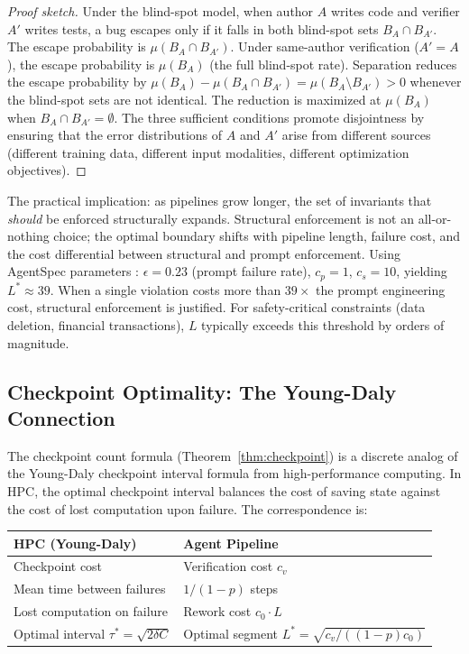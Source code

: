 \begin{proof}[Proof sketch]
Under the blind-spot model, when author $A$ writes code and verifier $A'$ writes tests, a bug escapes only if it falls in both blind-spot sets $B_A \cap B_{A'}$. The escape probability is $\mu(B_A \cap B_{A'})$. Under same-author verification ($A' = A$), the escape probability is $\mu(B_A)$ (the full blind-spot rate). Separation reduces the escape probability by $\mu(B_A) - \mu(B_A \cap B_{A'}) = \mu(B_A \setminus B_{A'}) > 0$ whenever the blind-spot sets are not identical. The reduction is maximized at $\mu(B_A)$ when $B_A \cap B_{A'} = \emptyset$. The three sufficient conditions promote disjointness by ensuring that the error distributions of $A$ and $A'$ arise from different sources (different training data, different input modalities, different optimization objectives).
\end{proof}

The practical implication: as pipelines grow longer, the set of invariants that \emph{should} be enforced structurally expands. Structural enforcement is not an all-or-nothing choice; the optimal boundary shifts with pipeline length, failure cost, and the cost differential between structural and prompt enforcement. Using AgentSpec parameters \citep{wang2026agentspec}: $\epsilon = 0.23$ (prompt failure rate), $c_p = 1$, $c_s = 10$, yielding $L^* \approx 39$. When a single violation costs more than $39\times$ the prompt engineering cost, structural enforcement is justified. For safety-critical constraints (data deletion, financial transactions), $L$ typically exceeds this threshold by orders of magnitude.

\subsection{Checkpoint Optimality: The Young-Daly Connection}

The checkpoint count formula (Theorem~\ref{thm:checkpoint}) is a discrete analog of the Young-Daly checkpoint interval formula \citep{young1974first, daly2006higher} from high-performance computing. In HPC, the optimal checkpoint interval balances the cost of saving state against the cost of lost computation upon failure. The correspondence is:

\begin{center}
\small
\begin{tabular}{ll}
\toprule
\textbf{HPC (Young-Daly)} & \textbf{Agent Pipeline} \\
\midrule
Checkpoint cost & Verification cost $c_v$ \\
Mean time between failures & $1/(1-p)$ steps \\
Lost computation on failure & Rework cost $c_0 \cdot L$ \\
Optimal interval $\tau^* = \sqrt{2 \delta C}$ & Optimal segment $L^* = \sqrt{c_v / ((1-p) c_0)}$ \\
\bottomrule
\end{tabular}
\end{center}

